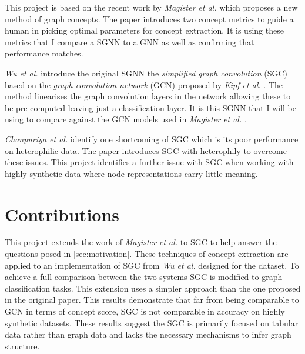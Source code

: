 
This project is based on the recent work by \textit{Magister et al.} \cite{magister2021gcexplainer} which proposes a new method of graph concepts.
The paper introduces two concept metrics to guide a human in picking optimal parameters for concept extraction.
It is using these metrics that I compare a SGNN to a GNN as well as confirming that performance matches.




\textit{Wu et al.} \cite{wu2019simplifying} introduce the original SGNN the \emph{simplified graph convolution} (SGC) based on the \emph{graph convolution network} (GCN) proposed by \textit{Kipf et al.} \cite{kipf2016semi}.
The method linearises the graph convolution layers in the network allowing these to be pre-computed leaving just a classification layer.
It is this SGNN that I will be using to compare against the GCN models used in \textit{Magister et al.} \cite{magister2021gcexplainer}.




\textit{Chanpuriya et al.} \cite{chanpuriya2022simplified} identify one shortcoming of SGC which is its poor performance on heterophilic data.
The paper introduces SGC with heterophily to overcome these issues. 
This project identifies a further issue with SGC when working with highly synthetic data where node representations carry little meaning.


\section{Contributions}


This project extends the work of \textit{Magister et al.} \cite{magister2021gcexplainer} to SGC \cite{wu2019simplifying} to help answer the questions posed in \ref{sec:motivation}.
These techniques of concept extraction are applied to an implementation of SGC from \textit{Wu et al.} designed for the dataset.
To achieve a full comparison between the two systems SGC is modified to graph classification tasks. 
This extension uses a simpler approach than the one proposed in the original paper.
This results demonstrate that far from being comparable to GCN in terms of concept score, SGC is not comparable in accuracy on highly synthetic datasets.
These results suggest the SGC is primarily focused on tabular data rather than graph data and lacks the necessary mechanisms to infer graph structure.

